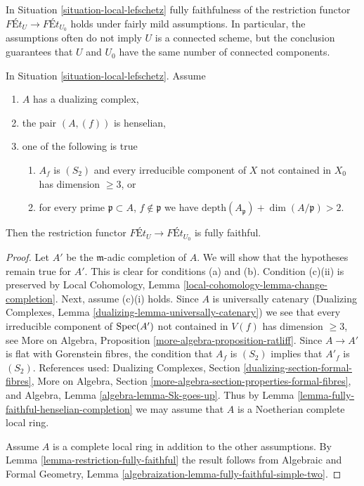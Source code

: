 \noindent
In Situation \ref{situation-local-lefschetz}
fully faithfulness of the restriction functor
$\textit{F\'Et}_U \longrightarrow \textit{F\'Et}_{U_0}$
holds under fairly mild assumptions.
In particular, the assumptions often do not imply
$U$ is a connected scheme, but the conclusion guarantees
that $U$ and $U_0$ have the same number of connected components.

\begin{lemma}
\label{lemma-fully-faithful-simple}
In Situation \ref{situation-local-lefschetz}. Assume
\begin{enumerate}
\item[(a)] $A$ has a dualizing complex,
\item[(b)] the pair $(A, (f))$ is henselian,
\item[(c)] one of the following is true
\begin{enumerate}
\item[(i)] $A_f$ is $(S_2)$ and every irreducible component of $X$
not contained in $X_0$ has dimension $\geq 3$, or
\item[(ii)] for every prime
$\mathfrak p \subset A$, $f \not \in \mathfrak p$ we have
$\text{depth}(A_\mathfrak p) + \dim(A/\mathfrak p) > 2$.
\end{enumerate}
\end{enumerate}
Then the restriction functor
$\textit{F\'Et}_U \longrightarrow \textit{F\'Et}_{U_0}$
is fully faithful.
\end{lemma}

\begin{proof}
Let $A'$ be the $\mathfrak m$-adic completion of $A$. We will show that
the hypotheses remain true for $A'$. This is clear for conditions
(a) and (b). Condition (c)(ii) is preserved by
Local Cohomology, Lemma \ref{local-cohomology-lemma-change-completion}.
Next, assume (c)(i) holds. Since $A$ is universally catenary
(Dualizing Complexes, Lemma \ref{dualizing-lemma-universally-catenary})
we see that every irreducible component of $\mathop{\mathrm{Spec}}(A')$ not contained in $V(f)$
has dimension $\geq 3$, see
More on Algebra, Proposition \ref{more-algebra-proposition-ratliff}.
Since $A \to A'$ is flat with Gorenstein fibres,
the condition that $A_f$ is $(S_2)$ implies that $A'_f$ is $(S_2)$.
References used:
Dualizing Complexes, Section \ref{dualizing-section-formal-fibres},
More on Algebra, Section \ref{more-algebra-section-properties-formal-fibres},
and Algebra, Lemma \ref{algebra-lemma-Sk-goes-up}.
Thus by Lemma \ref{lemma-fully-faithful-henselian-completion}
we may assume that $A$ is a Noetherian complete local ring.

\medskip\noindent
Assume $A$ is a complete local ring in addition to the other assumptions.
By Lemma \ref{lemma-restriction-fully-faithful} the result follows from
Algebraic and Formal Geometry, Lemma
\ref{algebraization-lemma-fully-faithful-simple-two}.
\end{proof}

